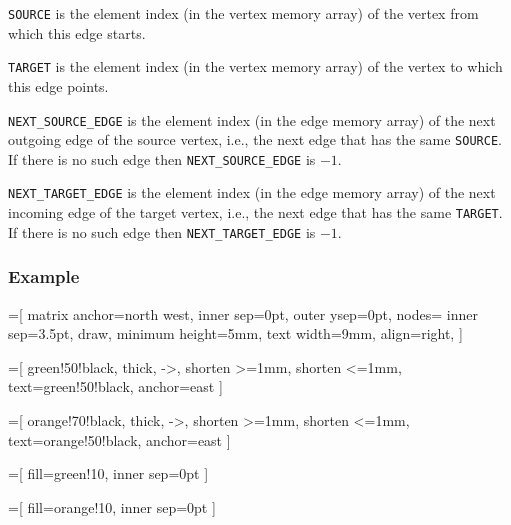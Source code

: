 \texttt{SOURCE} is the element index (in the vertex memory array) of the vertex from which this edge starts.

\texttt{TARGET} is the element index (in the vertex memory array) of the vertex to which this edge points.

\texttt{NEXT\_SOURCE\_EDGE} is the element index (in the edge memory array) of the next outgoing edge of the source vertex,
	i.e., the next edge that has the same \texttt{SOURCE}.
If there is no such edge then \texttt{NEXT\_SOURCE\_EDGE} is $-1$.

\texttt{NEXT\_TARGET\_EDGE} is the element index (in the edge memory array) of the next incoming edge of the target vertex,
	i.e., the next edge that has the same \texttt{TARGET}.
If there is no such edge then \texttt{NEXT\_TARGET\_EDGE} is $-1$.





\subsubsection{Example}

=[
  	matrix anchor=north west,
		inner sep=0pt,
		outer ysep=0pt,
		nodes={
			inner sep=3.5pt,
			draw,
			minimum height=5mm,
			text width=9mm,
			align=right,
		}
	]

=[
		green!50!black,
		thick,
		->,
		shorten >=1mm,
		shorten <=1mm,
		text=green!50!black,
		anchor=east
	]

=[
		orange!70!black,
		thick,
		->,
		shorten >=1mm,
		shorten <=1mm,
		text=orange!50!black,
		anchor=east
	]

=[
		fill=green!10,
		inner sep=0pt
	]

=[
		fill=orange!10,
		inner sep=0pt
	]

\newcommand{\spot}[4]{
  \matrix (s) at (s.south west) [spot matrix]
  {
    \node (s#4c1) [text=red] {#1}; \\
    \node (s#4c2) [text=red] {#2}; \\
    \node (s#4c3) [minimum height=13.5mm] {}; \\
  };
	\node at (s#4c1.west) [text width=2mm, draw=none, xshift=2mm, text=black] {$#4$};
	\node at (s#4c1.west) [text width=3mm, draw=none, xshift=-1mm, text=blue, font=\scriptsize] {#3};
}


